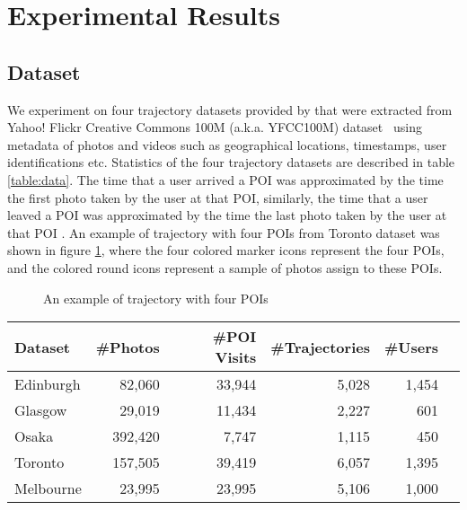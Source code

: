 \section{Experimental Results}
\label{experiment}

\subsection{Dataset}
\label{experiment:dataset}
We experiment on four trajectory datasets provided by \cite{ijcai15} that were
extracted from Yahoo! Flickr Creative Commons 100M (a.k.a. YFCC100M) dataset~\cite{thomee2016yfcc100m} 
using metadata of photos and videos such as geographical locations, timestamps, user identifications etc.
Statistics of the four trajectory datasets are described in table \ref{table:data}.
%
The time that a user arrived a POI was approximated by the time the first photo taken by the user at that POI,
similarly, the time that a user leaved a POI was approximated by the time the last photo taken by the user at 
that POI \cite{ht10, ijcai15}.
An example of trajectory with four POIs from Toronto dataset was shown in figure \ref{fig:traj}, 
where the four colored marker icons represent the four POIs, 
and the colored round icons represent a sample of photos assign to these POIs.


\begin{figure}
\centering
{}
\caption{An example of trajectory with four POIs}
\label{fig:traj}
\end{figure}

\begin{table*}
\centering
\begin{tabular}{lrrrrr} \hline
\textbf{Dataset} & \textbf{\#Photos} & \textbf{\#POI Visits} & \textbf{\#Trajectories} & \textbf{\#Users} \\ \hline
Edinburgh & 82,060 & 33,944 & 5,028 & 1,454 \\ 
Glasgow & 29,019 & 11,434 & 2,227 & 601 \\ 
Osaka & 392,420 & 7,747 & 1,115 & 450 \\ 
Toronto & 157,505 & 39,419 & 6,057 & 1,395 \\ 
Melbourne & 23,995 & 23,995 & 5,106 & 1,000 \\ 
\hline
\end{tabular}
\caption{Statistics of trajectory dataset}
\label{table:data}
\end{table*}


